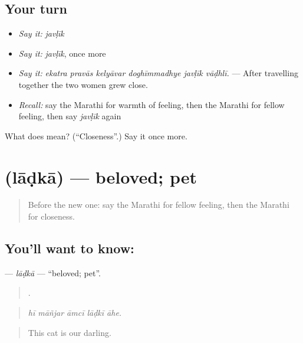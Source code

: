 \subsection*{Your turn}
\begin{itemize}
\raggedright
  \item \emph{Say it:} \emph{javḷīk}
  \item \emph{Say it:} \emph{javḷīk}, once more
  \item \emph{Say it:} \emph{ekatra pravās kelyāvar doghīmmadhye javḷīk vāḍhlī.} — After travelling together the two women grew close.
  \item \emph{Recall:} say the Marathi for warmth of feeling, then the Marathi for fellow feeling, then say \emph{javḷīk} again
\end{itemize}

\begin{tcolorbox}[breakable,colback=teal!4,colframe=teal!35!black,title={Before you move on}]
What does  mean? (\textquotedblleft{}Closeness\textquotedblright{}.) Say it once more.
\end{tcolorbox}
\section[\texorpdfstring{\mr{लाडका} (lāḍkā)}{लाडका (lāḍkā)}]{ (lāḍkā) — beloved; pet}

\label{lesson:MR-C460-ladka}



\begin{quote}
Before the new one: say the Marathi for fellow feeling, then the Marathi for closeness.
\end{quote}

\subsection*{You'll want to know: }
\textbf{} — \emph{lāḍkā} — \textquotedblleft{}beloved; pet\textquotedblright{}.

\begin{quote}
    .
\end{quote}

\begin{quote}
\emph{hī māñjar āmcī lāḍkī āhe.}
\end{quote}

\begin{quote}
This cat is our darling.
\end{quote}

